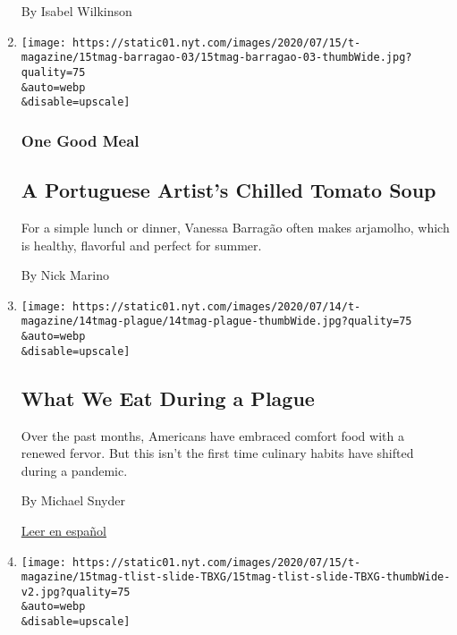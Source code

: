 \begin{enumerate}
  By Isabel Wilkinson
\item
  \href{/2020/07/17/t-magazine/summer-recipes-arjamolho-soup-vanessa-barragao.html}{}

  \texttt{[image: https://static01.nyt.com/images/2020/07/15/t-magazine/15tmag-barragao-03/15tmag-barragao-03-thumbWide.jpg?quality=75\\\&auto=webp\\\&disable=upscale]}

  \hypertarget{one-good-meal-5}{%
  \subsubsection{One Good Meal}\label{one-good-meal-5}}

  \hypertarget{a-portuguese-artists-chilled-tomato-soup}{%
  \subsection{A Portuguese Artist's Chilled Tomato
  Soup}\label{a-portuguese-artists-chilled-tomato-soup}}

  For a simple lunch or dinner, Vanessa Barragão often makes arjamolho,
  which is healthy, flavorful and perfect for summer.

  By Nick Marino
\item
  \href{/2020/07/16/t-magazine/eating-food-during-plague.html}{}

  \texttt{[image: https://static01.nyt.com/images/2020/07/14/t-magazine/14tmag-plague/14tmag-plague-thumbWide.jpg?quality=75\\\&auto=webp\\\&disable=upscale]}

  \hypertarget{what-we-eat-during-a-plague}{%
  \subsection{What We Eat During a
  Plague}\label{what-we-eat-during-a-plague}}

  Over the past months, Americans have embraced comfort food with a
  renewed fervor. But this isn't the first time culinary habits have
  shifted during a pandemic.

  By Michael Snyder

  \href{https://www.nytimes.com/es/2020/07/23/t-magazine/comida-pandemia.html}{Leer
  en español}
\item
  \href{/2020/07/16/t-magazine/margo-price-album-tlist.html}{}

  \texttt{[image: https://static01.nyt.com/images/2020/07/15/t-magazine/15tmag-tlist-slide-TBXG/15tmag-tlist-slide-TBXG-thumbWide-v2.jpg?quality=75\\\&auto=webp\\\&disable=upscale]}


\end{enumerate}
